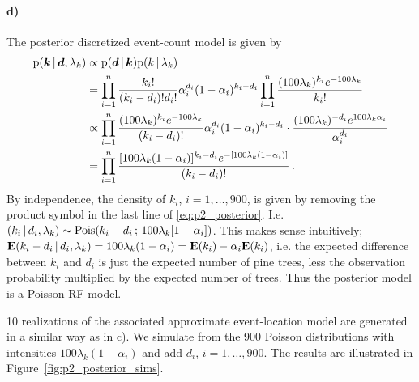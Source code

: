 \paragraph{d)}
The posterior discretized  event-count model is given by
%
\begin{equation}
\label{eq:p2_posterior}
\begin{split}
    \mathrm{p}(\bm{k} \, | \, \bm{d}, \lambda_k) &\propto \mathrm{p}(\bm{d} \, | \, \bm{k}) \mathrm{p}(k \, | \, \lambda_k) \\
    &= \prod_{i=1}^n \frac{k_i!}{(k_i - d_i)!d_i!} \alpha_i^{d_i} (1 - \alpha_i)^{k_i - d_i} \prod_{i=1}^n \frac{(100\lambda_k)^{k_i} e^{-100\lambda_k}}{k_i!} \\
    &\propto \prod_{i=1}^n \frac{(100\lambda_k)^{k_i} e^{-100\lambda_k}}{(k_i - d_i)!} \alpha_i^{d_i} (1 - \alpha_i)^{k_i - d_i} \cdot \frac{(100\lambda_k)^{-d_i} e^{100\lambda_k\alpha_i}}{\alpha_i^{d_i}} \\
    &= \prod_{i=1}^n \frac{[100\lambda_k(1-\alpha_i)]^{k_i-d_i} e^{-[100\lambda_k(1-\alpha_i)]}}{(k_i-d_i)!} \, .
\end{split}
\end{equation}
%
By independence, the density of $k_i$, $i = 1, \dots, 900$, is given by removing the product symbol in the last line of \eqref{eq:p2_posterior}. I.e. $(k_i \, | \, d_i, \lambda_k) \sim \mathrm{Pois}(k_i - d_i \,;\, 100\lambda_k[1-\alpha_i])$. This makes sense intuitively; ${\rm I\kern-.3em E}(k_i - d_i \, | \, d_i, \lambda_k) = 100\lambda_k(1-\alpha_i) = {\rm I\kern-.3em E}(k_i) - \alpha_i{\rm I\kern-.3em E}(k_i)$, i.e. the expected difference between $k_i$ and $d_i$ is just the expected number of pine trees, less the observation probability multiplied by the expected number of trees. Thus the posterior model is a Poisson RF model.

10 realizations of the associated approximate event-location model are generated in a similar way as in c). We simulate from the 900 Poisson distributions with intensities $100\lambda_k(1-\alpha_i)$ and add $d_i$, $i = 1, \dots, 900$. The results are illustrated in Figure~\ref{fig:p2_posterior_sims}.

